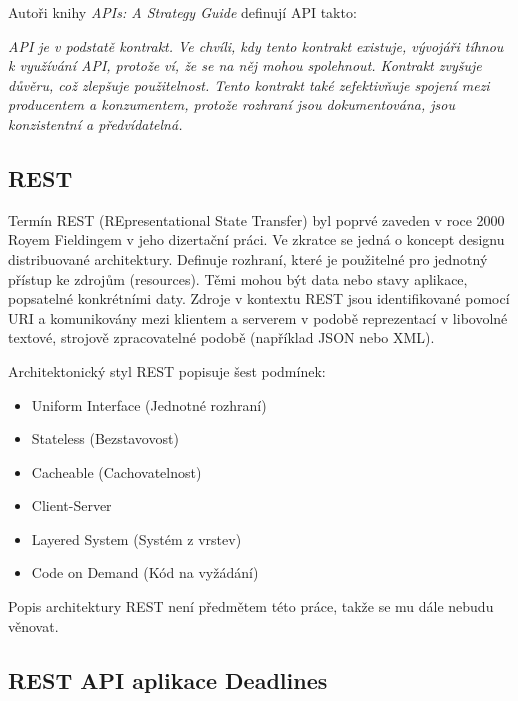\documentclass[thesis=B,czech]{FITthesis}[2012/06/26]
\begin{document}
			Autoři knihy \textit{APIs: A Strategy Guide} \cite{apis-a-strategy-guide} definují API takto:
			
			\textit{API je v podstatě kontrakt. Ve chvíli, kdy tento kontrakt existuje, vývojáři tíhnou k využívání API, protože ví, že se na něj mohou spolehnout. Kontrakt zvyšuje důvěru, což zlepšuje použitelnost. Tento kontrakt také zefektivňuje spojení mezi producentem a konzumentem, protože rozhraní jsou dokumentována, jsou konzistentní a předvídatelná.}
	
		\subsection{REST}
			Termín REST (REpresentational State Transfer) byl poprvé zaveden v roce 2000 Royem Fieldingem v jeho dizertační práci. \cite{rest-dissertation} Ve zkratce se jedná o koncept designu distribuované architektury. Definuje rozhraní, které je použitelné pro jednotný přístup ke zdrojům (resources). Těmi mohou být data nebo stavy aplikace, popsatelné konkrétními daty.
			Zdroje v kontextu REST jsou identifikované pomocí URI a komunikovány mezi klientem a serverem v podobě reprezentací v libovolné textové, strojově zpracovatelné podobě (například JSON nebo XML). \cite{rest-youtube}
			
			Architektonický styl REST popisuje šest podmínek:
			\begin{itemize}
				\item Uniform Interface (Jednotné rozhraní)
				\item Stateless (Bezstavovost)
				\item Cacheable (Cachovatelnost)
				\item Client-Server
				\item Layered System (Systém z vrstev)
				\item Code on Demand (Kód na vyžádání)
			\end{itemize}
			Popis architektury REST není předmětem této práce, takže se mu dále nebudu věnovat.
			
		\subsection{REST API aplikace Deadlines}
			
\end{document}
